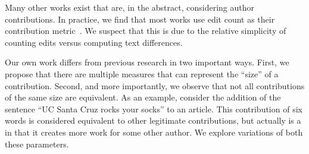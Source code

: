 Many other works exist that are, in the abstract, considering
author contributions.  In practice, we find that most works
use edit count as their contribution
metric~\cite{Wilkinson2007,Burke2008,Suh2008,Ortega2007,Stein2007}.
We suspect that this is due to the relative simplicity of
counting edits versus computing text differences.

Our own work differs from previous research in two important ways.
First, we propose that there are multiple measures that
can represent the ``size'' of a contribution.
Second, and more importantly, we observe that not all
contributions of the same size are equivalent.
As an example, consider the addition of the sentence ``UC Santa
Cruz rocks your socks'' to an article.
This contribution of six words is considered equivalent to other
legitimate contributions, but actually is a 
in that it creates more work for some other author.
We explore variations of both these parameters.

